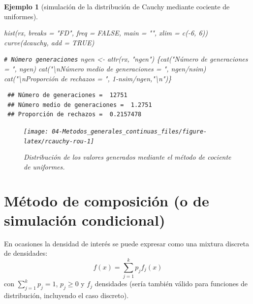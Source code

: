 \documentclass[
]{book}
\newenvironment{Shaded}{\begin{snugshade}}{\end{snugshade}}
\newcommand{\AttributeTok}[1]{\textcolor[rgb]{0.77,0.63,0.00}{#1}}
\newcommand{\CommentTok}[1]{\textcolor[rgb]{0.56,0.35,0.01}{\textit{#1}}}
\newcommand{\ConstantTok}[1]{\textcolor[rgb]{0.00,0.00,0.00}{#1}}
\newcommand{\DecValTok}[1]{\textcolor[rgb]{0.00,0.00,0.81}{#1}}
\newcommand{\FunctionTok}[1]{\textcolor[rgb]{0.00,0.00,0.00}{#1}}
\newcommand{\NormalTok}[1]{#1}
\newcommand{\OtherTok}[1]{\textcolor[rgb]{0.56,0.35,0.01}{#1}}
\newcommand{\SpecialCharTok}[1]{\textcolor[rgb]{0.00,0.00,0.00}{#1}}
\newcommand{\StringTok}[1]{\textcolor[rgb]{0.31,0.60,0.02}{#1}}
\theoremstyle{break}
\newtheorem{example}{Ejemplo}[chapter]
\theoremstyle{nonumberplain}
\renewcommand{\CommentTok}[1]{\textcolor[rgb]{0.41,0.41,0.41}{\texttt{#1}}}
\begin{document}
\begin{example}[simulación de la distribución de Cauchy mediante cociente de uniformes]
\begin{Shaded}
\begin{Highlighting}[]
\FunctionTok{hist}\NormalTok{(rx, }\AttributeTok{breaks =} \StringTok{"FD"}\NormalTok{, }\AttributeTok{freq =} \ConstantTok{FALSE}\NormalTok{, }\AttributeTok{main =} \StringTok{""}\NormalTok{, }\AttributeTok{xlim =} \FunctionTok{c}\NormalTok{(}\SpecialCharTok{{-}}\DecValTok{6}\NormalTok{, }\DecValTok{6}\NormalTok{))}
\FunctionTok{curve}\NormalTok{(dcauchy, }\AttributeTok{add =} \ConstantTok{TRUE}\NormalTok{)}

\CommentTok{\# Número generaciones}
\NormalTok{ngen }\OtherTok{\textless{}{-}} \FunctionTok{attr}\NormalTok{(rx, }\StringTok{"ngen"}\NormalTok{)}
\NormalTok{\{}\FunctionTok{cat}\NormalTok{(}\StringTok{"Número de generaciones = "}\NormalTok{, ngen)}
\FunctionTok{cat}\NormalTok{(}\StringTok{"}\SpecialCharTok{\textbackslash{}n}\StringTok{Número medio de generaciones = "}\NormalTok{, ngen}\SpecialCharTok{/}\NormalTok{nsim)}
\FunctionTok{cat}\NormalTok{(}\StringTok{"}\SpecialCharTok{\textbackslash{}n}\StringTok{Proporción de rechazos = "}\NormalTok{, }\DecValTok{1}\SpecialCharTok{{-}}\NormalTok{nsim}\SpecialCharTok{/}\NormalTok{ngen,}\StringTok{"}\SpecialCharTok{\textbackslash{}n}\StringTok{"}\NormalTok{)\}}
\end{Highlighting}
\end{Shaded}

\begin{verbatim}
 ## Número de generaciones =  12751
 ## Número medio de generaciones =  1.2751
 ## Proporción de rechazos =  0.2157478
\end{verbatim}

\begin{figure}[!htb]

{\centering \texttt{[image: 04-Metodos\_generales\_continuas\_files/figure-latex/rcauchy-rou-1]} 

}

\caption{Distribución de los valores generados mediante el método de cociente de uniformes.}\label{fig:rcauchy-rou}
\end{figure}

\end{example}

\hypertarget{composicion}{%
\section{Método de composición (o de simulación condicional)}\label{composicion}}

En ocasiones la densidad de interés se puede expresar como una mixtura discreta de densidades:
\[f(x)=\sum_{j=1}^{k}p_{j}f_{j}(x)\]
con \(\sum_{j=1}^{k}p_j=1\), \(p_j\geq 0\) y \(f_j\) densidades (sería también válido para funciones de distribución, incluyendo el caso discreto).
\end{document}

